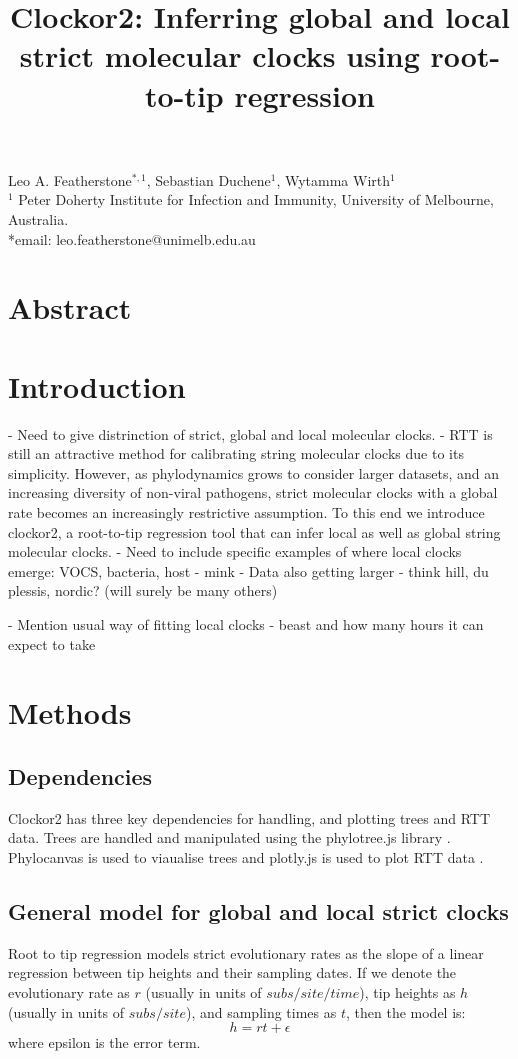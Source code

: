 \documentclass{article}
\title{Clockor2:  Inferring global and local strict molecular clocks using root-to-tip regression}
\begin{document}
\maketitle
\begin{centering}
Leo A. Featherstone$^{\ast,1}$, Sebastian Duchene$^1$, Wytamma Wirth$^{1}$\\
$^{1}$ Peter Doherty Institute for Infection and Immunity, University of Melbourne, Australia.\\
*email: leo.featherstone@unimelb.edu.au
\end{centering}

\section*{Abstract}


\section*{Introduction}
- Need to give distrinction of strict, global and local molecular clocks.
- RTT is still an attractive method for calibrating string molecular clocks due to its simplicity. However, as phylodynamics grows to consider larger datasets, and an increasing diversity of non-viral pathogens, strict molecular clocks with a global rate becomes an increasingly restrictive assumption. To this end we introduce clockor2, a root-to-tip regression tool that  can infer local as well as global string molecular clocks.
- Need to include specific examples of where local clocks emerge: VOCS, bacteria, host - mink
- Data also getting larger - think hill, du plessis, nordic? (will surely be many others)

- Mention usual way of fitting local clocks - beast and how many hours it can expect to take

\section*{Methods}
\subsection*{Dependencies}
Clockor2 has three key dependencies for handling, and plotting trees and RTT data. Trees are handled and manipulated using the phylotree.js library \citep{shank_phylotreejs_2018}. Phylocanvas is used to viaualise trees and plotly.js is used to plot RTT data \citep{abudahab_phylocanvasgl_2021}.

\subsection*{General model for global and local strict clocks}
Root to tip regression models strict evolutionary rates as the slope of a linear regression between tip heights and their sampling dates. If we denote the evolutionary rate as $r$ (usually in units of $subs/site/time$), tip heights as $h$ (usually in units of $subs/site$), and sampling times as $t$, then the model is:
\begin{equation*}
    h = rt + \epsilon
\end{equation*}
where epsilon is the error term.
\end{document}
